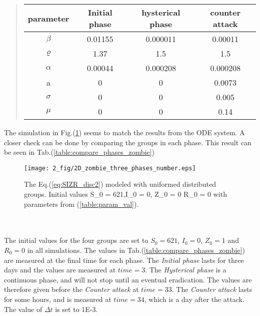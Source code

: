 \documentclass[%
twoside,                 %
final,                   %
chapterprefix=true,      %
open=right               %
10pt]{book}
\begin{document}
\label{table:param_val}

\begin{quote}
\begin{tabular}{cccc}
\hline
\multicolumn{1}{c}{ parameter } & \multicolumn{1}{c}{ Initial phase } & \multicolumn{1}{c}{ hysterical phase } & \multicolumn{1}{c}{ counter attack } \\
\hline
$\beta$          & 0.01155          & 0.000011         & 0.00011          \\
$\varrho$        & 1.37             & 1.5              & 1.5              \\
$\alpha$         & 0.00044          & 0.000208         & 0.000208         \\
a                & 0                & 0                & 0.0073           \\
$\sigma$         & 0                & 0                & 0.005            \\
$\mu$            & 0                & 0                & 0.14             \\
\hline
\end{tabular}
\end{quote}

\noindent
The simulation in Fig.(\ref{fig:zombie_three_number}) seems to match the results from the ODE system. A closer check can be done by comparing the groups in each phase. This result can be seen in Tab.(\ref{table:compare_phases_zombie}) 


\begin{figure}[ht]
  \centerline{\texttt{[image: 2\_fig/2D\_zombie\_three\_phases\_number.eps]}}
  \caption{
  \label{fig:zombie_three_number} The Eq.(\ref{eq:SIZR_disc2}) modeled with uniformed distributed groups. Initial values S_0 = 621,I_0 = 0, Z_0 = 0 R_0 = 0 with parameters from (\ref{table:param_val}).
  }
\end{figure}


\\
\\
The initial values for the four groups are set to $S_0=621$, $I_0=0$, $Z_0=1$ and $R_0= 0$ in all simulations. The values in Tab.(\ref{table:compare_phases_zombie}) are measured at the final time for each phase. The \emph{Initial phase} lasts for three days and the values are measured at $time=3$. The \emph{Hysterical phase} is a continuous phase, and will not stop until an eventual eradication. The values are therefore given before the \emph{Counter attack} at $time=33$. The \emph{Counter attack} lasts for some hours, and is measured at $time=34$, which is a day after the attack. The value of $\Delta t$ is set to 1E-3. 
\end{document}
